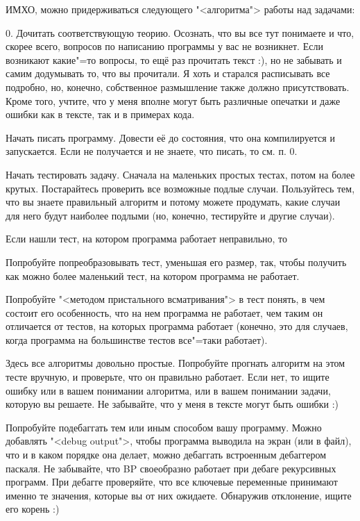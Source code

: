 ИМХО, можно придерживаться следующего "<алгоритма"> работы над задачами:
\begin{olist}
\item[0.] Дочитать соответствующую теорию. Осознать, что вы все тут понимаете и что, скорее всего, вопросов по
написанию программы у вас не возникнет. Если возникают какие"=то вопросы, то ещё раз прочитать текст :),
но не забывать и самим додумывать то, что вы прочитали. Я хоть и старался расписывать все подробно,
но, конечно, собственное размышление также должно присутствовать. Кроме того, учтите, что у меня вполне могут быть
различные опечатки и даже ошибки как в тексте, так и в примерах кода.
\item Начать писать программу. Довести её до состояния, что она компилируется и запускается. Если не получается
и не знаете, что писать, то см. п. 0.
\item Начать тестировать задачу. Сначала на маленьких простых тестах, потом на более крутых. Постарайтесь проверить
все возможные подлые случаи. Пользуйтесь тем, что вы знаете правильный алгоритм и потому можете продумать, какие случаи 
для него будут наиболее подлыми (но, конечно, тестируйте и другие случаи). 

Если нашли тест, на котором программа работает неправильно, то
\begin{ulist}
\item Попробуйте попреобразовывать тест, уменьшая его размер, так, чтобы получить как можно более маленький тест,
на котором программа не работает.
\item Попробуйте "<методом пристального всматривания"> в тест понять, в чем состоит его особенность, что на нем программа 
не работает, чем таким он отличается от тестов, на которых программа работает (конечно, это для случаев, когда
программа на большинстве тестов все"=таки работает).
\item Здесь все алгоритмы довольно простые. Попробуйте прогнать алгоритм на этом тесте вручную, и проверьте,
что он правильно работает. Если нет, то ищите ошибку или в вашем понимании алгоритма, или в вашем понимании задачи,
которую вы решаете. Не забывайте, что у меня в тексте могут быть ошибки :)
\item Попробуйте подебаггать тем или иным способом вашу программу. Можно добавлять "<debug output">, чтобы
программа выводила на экран (или в файл), что и в каком порядке она делает, можно дебаггать встроенным дебаггером
паскаля. Не забывайте, что BP своеобразно работает при дебаге рекурсивных программ. При дебагге проверяйте, что
все ключевые переменные принимают именно те значения, которые вы от них ожидаете. Обнаружив отклонение,
ищите его корень :)
\end{ulist}
\end{olist}

